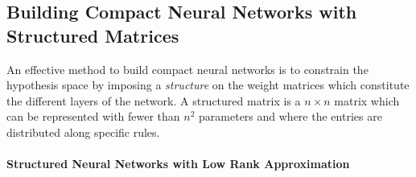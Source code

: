 \subsection{Building Compact Neural Networks with Structured Matrices}
\label{subsection:ch3-building_compact_neural_networks_with_structured_matrices}







An effective method to build compact neural networks is to constrain the hypothesis space by imposing a \emph{structure} on the weight matrices which constitute the different layers of the network.
A structured matrix is a $n \times n$ matrix which can be represented with fewer than $n^2$ parameters and where the entries are distributed along specific rules.

\paragraph{Structured Neural Networks with Low Rank Approximation} ~\\

